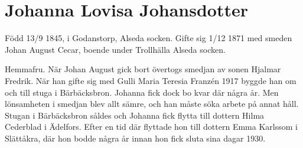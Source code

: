 \chapter{Johanna Lovisa Johansdotter}
\label{johanna_lovisa_johansdotter}
Född 13/9 1845, i Godanstorp, Alseda socken.
Gifte sig 1/12 1871 med smeden Johan August Cecar, boende under Trollhälla Alseda socken.

Hemmafru. När Johan August gick bort övertogs smedjan av sonen Hjalmar Fredrik. När han gifte sig med Gulli Maria Teresia Franzén 1917 byggde han om och till stuga i Bärbäcksbron. Johanna fick dock bo kvar där några år. Men lönsamheten i smedjan blev allt sämre, och han måste söka arbete på annat håll. Stugan i Bärbäcksbron såldes och Johanna fick flytta till dottern Hilma Cederblad i Ädelfors. Efter en tid där flyttade hon till dottern Emma Karlssom i Slättåkra, där hon bodde några år innan hon fick sluta sina dagar 1930.